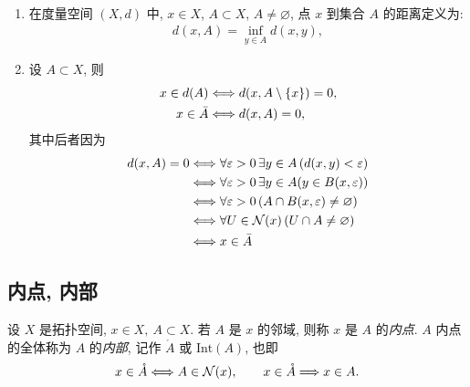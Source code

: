     \begin{Example}[度量空间上的导集与闭包]
        ~
        \begin{enumerate}
            \item 在度量空间 $ (X, d) $ 中, $ x\in X $, $ A\subset X $, $ A\ne \varnothing $, 点 $ x $ 到集合 $ A $ 的距离定义为:
            \begin{align*}
                d(x, A)=\inf_{y\in A}d(x, y),    
            \end{align*}
            \item 设 $ A\subset X $, 则
            \begin{align*}
                x\in d(A) & \Longleftrightarrow d(x, A\setminus\left\{ x \right\})=0,\\
                x\in \bar{A} & \Longleftrightarrow d(x, A)=0,
            \end{align*}
            其中后者因为
            \begin{align*}
                d(x, A)=0 & \Longleftrightarrow \forall\varepsilon>0\,\exists y\in A\,(d(x, y)<\varepsilon)\\
                & \Longleftrightarrow \forall\varepsilon>0\,\exists y\in A(y\in B(x, \varepsilon))\\
                & \Longleftrightarrow \forall \varepsilon>0\,(A\cap B(x, \varepsilon)\neq \varnothing)\\
                & \Longleftrightarrow \forall U\in\mathcal{N}(x)\,(U\cap A\neq \varnothing)\\
                & \Longleftrightarrow x\in \bar{A}
            \end{align*}
        \end{enumerate}
    \end{Example}

\subsection{内点, 内部}
    \begin{Definition}[内点, 内部]
        设 $ X $ 是拓扑空间, $ x\in X,\ A\subset X $. 若 $ A $ 是 $ x $ 的邻域, 则称 $ x $ 是 $ A $ 的\emph{内点}. $ A $ 内点的全体称为 $ A $ 的\emph{内部}, 记作 $ \mathring{A} $ 或 $ \mathrm{Int}(A) $, 也即
        \begin{align*}
            x\in\mathring{A}\Longleftrightarrow A\in\mathcal{N}(x),\qquad x\in\mathring{A}\Longrightarrow x\in A.
        \end{align*}
    \end{Definition}

